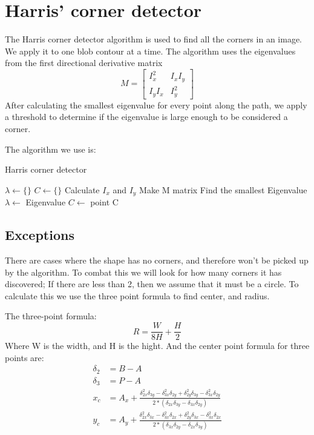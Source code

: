 \documentclass{article}
\begin{document}
	\section{Harris' corner detector}
	The Harris corner detector algorithm is used to find all the corners in an image. We apply it to one blob contour at a time.
	The algorithm uses the eigenvalues from the first directional derivative matrix
	$$
		M = \left[\begin{matrix}
		I_x^2 & I_xI_y \\
		I_yI_x & I_y^2
	\end{matrix}\right]
	$$
	After calculating the smallest eigenvalue for every point along the path, we apply a threshold to determine if the eigenvalue is large enough to be considered a corner.
		
	The algorithm we use is:
	\begin{algorithm}
		\caption{Harris corner detector}
		\begin{algorithmic}
			\State $\lambda \gets \{\}$
			\State $C \gets \{\}$
				\State Calculate $I_x$ and $I_y$
				\State Make M matrix
				\State Find the smallest Eigenvalue
				\State $\lambda \gets$ Eigenvalue
			\EndFor
					\State $C \gets$ point
				\EndIf
			\EndFor
			\State \Return C
		\end{algorithmic}
	\end{algorithm}

	\subsection{Exceptions}
	There are cases where the shape has no corners, and therefore won't be picked up by the algorithm. To combat this we will look for how many corners it has discovered; If there are less than 2, then we assume that it must be a circle. To calculate this we use the three point formula to find center, and radius.

	The three-point formula:
	$$
		R = \frac{W}{8H} + \frac{H}{2}
	$$
	Where W is the width, and H is the hight. And the center point formula for three points are:
	\begin{align*}
		\delta_2 &= B-A \\
		\delta_3 &= P-A \\
		x_c &= A_x + \frac{\delta_{2x}^2\delta_{3y} - \delta_{3x}^2\delta_{2y} + \delta_{2y}^2\delta_{3y} - \delta_{3x}^2\delta_{2y}}{2*(\delta_{2x}\delta_{3y} - \delta_{3x}\delta_{2y})}\\
		y_c &= A_y + \frac{\delta_{2x}^2\delta_{3x} - \delta_{3x}^2\delta_{2x} + \delta_{2y}^2\delta_{3x} - \delta_{3x}^2\delta_{2x}}{2*(\delta_{3x}\delta_{2y} - \delta_{2x}\delta_{3y})}\\
	\end{align*}
\end{document}
